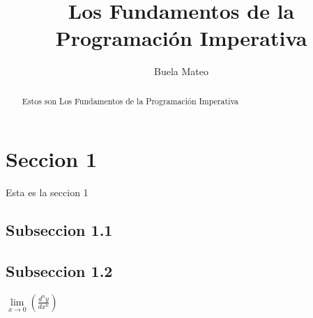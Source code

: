 \documentclass[a4paper,12pt]{article}
\title{Los Fundamentos de la Programación Imperativa}
\author{Buela Mateo}
\begin{document}
    

    \newpage
    \tableofcontents
    \newpage
    \begin{abstract}
        Estos son Los Fundamentos de la Programación Imperativa
    \end{abstract}
    \newpage
    \section{Seccion 1}
    Esta es la seccion 1
    \subsection{Subseccion 1.1}
    \subsection{Subseccion 1.2}

    \begin{math}
        \lim\limits_{x\to 0}(\frac{d^n y}{d x^n} )
    \end{math}
\end{document}
